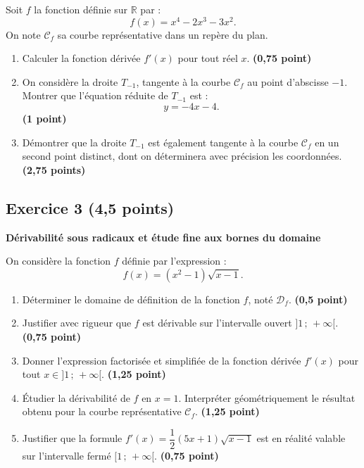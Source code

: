 \documentclass[11pt,a4paper]{article}
\newcommand{\R}{\mathbb{R}}
\begin{document}
\medskip
Soit $f$ la fonction définie sur $\R$ par :
\[
f(x) = x^4 - 2x^3 - 3x^2.
\]
On note $\mathcal{C}_f$ sa courbe représentative dans un repère du plan.

\begin{enumerate}
    \item Calculer la fonction dérivée $f'(x)$ pour tout réel $x$. \hfill \textbf{(0{,}75 point)}
    \item On considère la droite $T_{-1}$, tangente à la courbe $\mathcal{C}_f$ au point d'abscisse $-1$. Montrer que l'équation réduite de $T_{-1}$ est :
    \[
    y = -4x - 4.
    \] \hfill \textbf{(1 point)}
    \item Démontrer que la droite $T_{-1}$ est également tangente à la courbe $\mathcal{C}_f$ en un second point distinct, dont on déterminera avec précision les coordonnées. \hfill \textbf{(2{,}75 points)}
\end{enumerate}

\vspace{0.4cm}

\subsection*{Exercice 3 \hfill \normalfont\normalsize (4{,}5 points)}
\textbf{Dérivabilité sous radicaux et étude fine aux bornes du domaine}

\medskip
On considère la fonction $f$ définie par l'expression :
\[
f(x) = (x^2 - 1)\sqrt{x - 1}.
\]
\begin{enumerate}
    \item Déterminer le domaine de définition de la fonction $f$, noté $\mathcal{D}_f$. \hfill \textbf{(0{,}5 point)}
    \item Justifier avec rigueur que $f$ est dérivable sur l'intervalle ouvert $]1\,;\,+\infty[$. \hfill \textbf{(0{,}75 point)}
    \item Donner l'expression factorisée et simplifiée de la fonction dérivée $f'(x)$ pour tout $x \in ]1\,;\,+\infty[$. \hfill \textbf{(1{,}25 point)}
    \item Étudier la dérivabilité de $f$ en $x = 1$. Interpréter géométriquement le résultat obtenu pour la courbe représentative $\mathcal{C}_f$. \hfill \textbf{(1{,}25 point)}
    \item Justifier que la formule $f'(x) = \dfrac{1}{2}(5x + 1)\sqrt{x - 1}$ est en réalité valable sur l'intervalle fermé $[1\,;\,+\infty[$. \hfill \textbf{(0{,}75 point)}
\end{enumerate}
\end{document}

